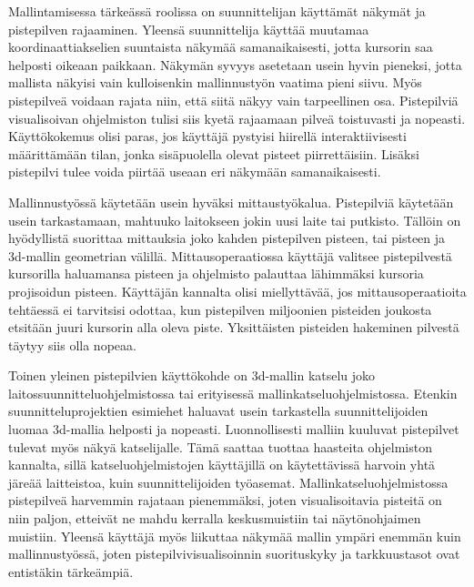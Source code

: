 Mallintamisessa tärkeässä roolissa on suunnittelijan käyttämät näkymät ja pistepilven rajaaminen. Yleensä suunnittelija käyttää muutamaa koordinaattiakselien suuntaista näkymää samanaikaisesti, jotta kursorin saa helposti oikeaan paikkaan. Näkymän syvyys asetetaan usein hyvin pieneksi, jotta mallista näkyisi vain kulloisenkin mallinnustyön vaatima pieni siivu. Myös pistepilveä voidaan rajata niin, että siitä näkyy vain tarpeellinen osa. Pistepilviä visualisoivan ohjelmiston tulisi siis kyetä rajaamaan pilveä toistuvasti ja nopeasti. Käyttökokemus olisi paras, jos käyttäjä pystyisi hiirellä interaktiivisesti määrittämään tilan, jonka sisäpuolella olevat pisteet piirrettäisiin. Lisäksi pistepilvi tulee voida piirtää useaan eri näkymään samanaikaisesti.

Mallinnustyössä käytetään usein hyväksi mittaustyökalua. Pistepilviä käytetään usein tarkastamaan, mahtuuko laitokseen jokin uusi laite tai putkisto. Tällöin on hyödyllistä suorittaa mittauksia joko kahden pistepilven pisteen, tai pisteen ja 3d-mallin geometrian välillä. Mittausoperaatiossa käyttäjä valitsee pistepilvestä kursorilla haluamansa pisteen ja ohjelmisto palauttaa lähimmäksi kursoria projisoidun pisteen. Käyttäjän kannalta olisi miellyttävää, jos mittausoperaatioita tehtäessä ei tarvitsisi odottaa, kun pistepilven miljoonien pisteiden joukosta etsitään juuri kursorin alla oleva piste. Yksittäisten pisteiden hakeminen pilvestä täytyy siis olla nopeaa.

Toinen yleinen pistepilvien käyttökohde on 3d-mallin katselu joko laitossuunnitteluohjelmistossa tai erityisessä mallinkatseluohjelmistossa. Etenkin suunnitteluprojektien esimiehet haluavat usein tarkastella suunnittelijoiden luomaa 3d-mallia helposti ja nopeasti. Luonnollisesti malliin kuuluvat pistepilvet tulevat myös näkyä katselijalle. Tämä saattaa tuottaa haasteita ohjelmiston kannalta, sillä katseluohjelmistojen käyttäjillä on käytettävissä harvoin yhtä järeää laitteistoa, kuin suunnittelijoiden työasemat. Mallinkatseluohjelmistossa pistepilveä harvemmin rajataan pienemmäksi, joten visualisoitavia pisteitä on niin paljon, etteivät ne mahdu kerralla keskusmuistiin tai näytönohjaimen muistiin. Yleensä käyttäjä myös liikuttaa näkymää mallin ympäri enemmän kuin mallinnustyössä, joten pistepilvivisualisoinnin suorituskyky ja tarkkuustasot ovat entistäkin tärkeämpiä.

